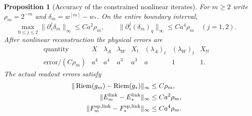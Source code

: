 \documentclass[11pt]{article}
\numberwithin{equation}{section}
\newtheorem{proposition}[proposition]{Proposition}
\theoremstyle{definition}
\theoremstyle{remark}
\begin{document}
\begin{proposition}[Accuracy of the constrained nonlinear iterates]
\label{prop:supp-exact-sweep-accuracy}
For $m\ge2$ write $\rho_m=2^{-m}$ and
$\delta_m=w^{[m]}-w_*$. On the entire boundary interval,
\begin{equation}
 \max_{0\le j\le2}\|\partial_s^j\delta_m\|_\infty\le Ca^2\rho_m,
 \qquad
 \|\partial_s^j(\delta_m)_q\|_\infty\le Ca^4\rho_m\quad(j=1,2).
 \label{eq:supp-exact-sweep-jets}
\end{equation}
After nonlinear reconstruction the physical errors are
\begin{equation}
 \begin{array}{c|ccccccc}
 \text{quantity}&X&\lambda_A&\lambda_W&X_t&(\lambda_A)_t&(\lambda_W)_t&X_{tt}\\\hline
 \text{error}/(C\rho_m)&a^4&a^4&a^3&a^3&a&1&1.
 \end{array}
 \label{eq:supp-exact-physical-error-table}
\end{equation}
The actual readout errors satisfy
\begin{equation}
 \begin{split}
 \|\operatorname{Riem}(g_m)-\operatorname{Riem}(g_*)\|_\infty&\le C\rho_m,\\
 \|E_m^{\rm link}-E_*^{\rm link}\|_\infty&\le Ca^2\rho_m,\\
 \|F_m^{\rm sp,link}-F_*^{\rm sp,link}\|_\infty&\le Ca^4\rho_m.
 \end{split}
 \label{eq:supp-exact-reader-accuracy}
\end{equation}
\end{proposition}
\end{document}
